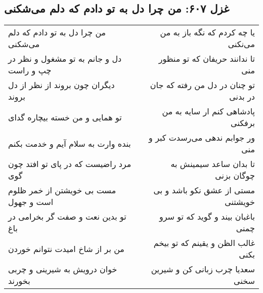 \begin{center}
\section*{غزل ۶۰۷: من چرا دل به تو دادم که دلم می‌شکنی}
\label{sec:607}
\begin{longtable}{l p{0.5cm} r}
من چرا دل به تو دادم که دلم می‌شکنی
&&
یا چه کردم که نگه باز به من می‌نکنی
\\
دل و جانم به تو مشغول و نظر در چپ و راست
&&
تا ندانند حریفان که تو منظور منی
\\
دیگران چون بروند از نظر از دل بروند
&&
تو چنان در دل من رفته که جان در بدنی
\\
تو همایی و من خسته بیچاره گدای
&&
پادشاهی کنم ار سایه به من برفکنی
\\
بنده وارت به سلام آیم و خدمت بکنم
&&
ور جوابم ندهی می‌رسدت کبر و منی
\\
مرد راضیست که در پای تو افتد چون گوی
&&
تا بدان ساعد سیمینش به چوگان بزنی
\\
مست بی خویشتن از خمر ظلوم است و جهول
&&
مستی از عشق نکو باشد و بی خویشتنی
\\
تو بدین نعت و صفت گر بخرامی در باغ
&&
باغبان بیند و گوید که تو سرو چمنی
\\
من بر از شاخ امیدت نتوانم خوردن
&&
غالب الظن و یقینم که تو بیخم بکنی
\\
خوان درویش به شیرینی و چربی بخورند
&&
سعدیا چرب زبانی کن و شیرین سخنی
\\
\end{longtable}
\end{center}
